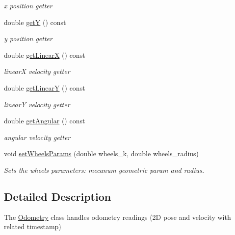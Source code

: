 \begin{DoxyCompactItemize}
\begin{DoxyCompactList}\small\item\em x position getter \end{DoxyCompactList}\item 
double \hyperlink{classmecanum__drive__controller_1_1Odometry_aa10bb571e668d1fe549c42bb9bad1ea6}{getY} () const
\begin{DoxyCompactList}\small\item\em y position getter \end{DoxyCompactList}\item 
double \hyperlink{classmecanum__drive__controller_1_1Odometry_a853fa4f4d60e6bde3156a040b2d2afd4}{get\+LinearX} () const
\begin{DoxyCompactList}\small\item\em linearX velocity getter \end{DoxyCompactList}\item 
double \hyperlink{classmecanum__drive__controller_1_1Odometry_a8099ac0900687515b3e700c9334594ab}{get\+LinearY} () const
\begin{DoxyCompactList}\small\item\em linearY velocity getter \end{DoxyCompactList}\item 
double \hyperlink{classmecanum__drive__controller_1_1Odometry_aede4d8f9fccf9c6b5ff41f035f383a0f}{get\+Angular} () const
\begin{DoxyCompactList}\small\item\em angular velocity getter \end{DoxyCompactList}\item 
void \hyperlink{classmecanum__drive__controller_1_1Odometry_aabd05f5d6caf20f0d2f7ba9406efe3e9}{set\+Wheels\+Params} (double wheels\+\_\+k, double wheels\+\_\+radius)
\begin{DoxyCompactList}\small\item\em Sets the wheels parameters\+: mecanum geometric param and radius. \end{DoxyCompactList}\end{DoxyCompactItemize}


\subsection{Detailed Description}
The \hyperlink{classmecanum__drive__controller_1_1Odometry}{Odometry} class handles odometry readings (2D pose and velocity with related timestamp) 

